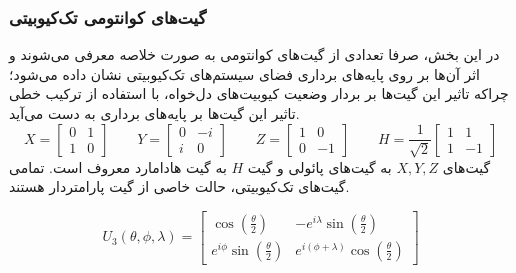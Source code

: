 \subsubsection{
    گیت‌های کوانتومی تک‌کیوبیتی
}
در این بخش، صرفا تعدادی از گیت‌های کوانتومی به صورت خلاصه معرفی می‌شوند و اثر آن‌ها بر روی پایه‌های برداری فضای سیستم‌های تک‌کیوبیتی نشان داده می‌شود؛ چراکه تاثیر این گیت‌ها بر بردار وضعیت کیوبیت‌های دل‌خواه، با استفاده از ترکیب خطی تاثیر این گیت‌ها بر پایه‌های برداری به دست می‌آید.
\begin{equation}
X = \begin{bmatrix} 0 & 1 \\ 1 & 0 \end{bmatrix} \qquad
Y = \begin{bmatrix} 0 & -i \\ i & 0 \end{bmatrix} \qquad
Z = \begin{bmatrix} 1 & 0 \\ 0 & -1 \end{bmatrix} \qquad
H = \frac{1}{\sqrt{2}} \begin{bmatrix} 1 & 1 \\ 1 & -1 \end{bmatrix}
\end{equation}
گیت‌های 
$X, Y, Z$
به گیت‌های پائولی و گیت
$H$
به گیت هادامارد معروف است.
تمامی گیت‌های تک‌کیوبیتی، حالت خاصی از گیت پارامتردار 
هستند.

\begin{equation}
U_3(\theta, \phi, \lambda) = \begin{bmatrix} \cos(\frac{\theta}{2}) & -e^{i\lambda}\sin(\frac{\theta}{2}) \\[6pt]
            e^{i\phi}\sin(\frac{\theta}{2}) & e^{i(\phi+\lambda)}\cos(\frac{\theta}{2})
     \end{bmatrix}
\end{equation}

